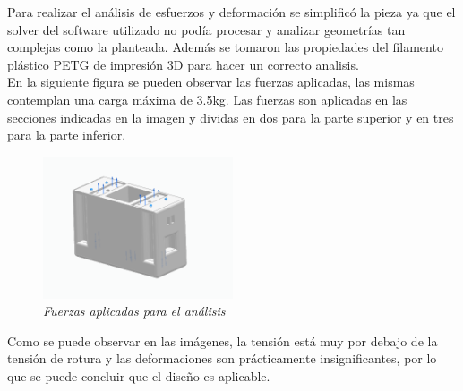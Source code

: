 Para realizar el análisis de esfuerzos y deformación se simplificó la pieza ya que el solver del software utilizado no podía procesar y analizar geometrías tan complejas como la planteada. Además se tomaron las propiedades del filamento plástico PETG de impresión 3D para hacer un correcto analisis.\\
En la siguiente figura se pueden observar las fuerzas aplicadas, las mismas contemplan una carga máxima de 3.5kg. Las fuerzas son aplicadas en las secciones indicadas en la imagen y dividas en dos para la parte superior y en tres para la parte inferior.\\
\begin{figure}[H]
    \centering
        \includegraphics[width=0.5\textwidth]{img/Fuerzas_superiores.png} \par
        \caption{\textit{Fuerzas aplicadas para el análisis}}
        \label{fig:fuerzas_sup}
\end{figure}
%    
Como se puede observar en las imágenes, la tensión está muy por debajo de la tensión de rotura y las deformaciones son prácticamente insignificantes, por lo que se puede concluir que el diseño es aplicable.\\
